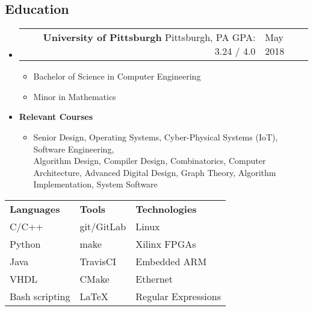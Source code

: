 \documentclass[18pt]{article}
\makeatletter
\providecommand{\tightlist}{
    \setlength{\itemsep}{0pt}\setlength{\parskip}{0pt}
}
\providecommand{\datetable}[2]{
    \begin{tabular*}{\textwidth}{@{}r @{\extracolsep{\fill}} l}
        #1 & #2
    \end{tabular*}
}
\makeatother
\begin{document}
    \subsection*{Education}\label{education}
    \begin{itemize}[label={}]

        \item \datetable{
            \textbf{University of Pittsburgh} \textbar{} Pittsburgh, PA \textbar{} GPA: 3.24 / 4.0
        }{May 2018}
        \begin{itemize}[ topsep=0pt]\tightlist
            \item Bachelor of Science in Computer Engineering
            \item Minor in Mathematics
        \end{itemize}
        \item \textbf{Relevant Courses}
        \begin{itemize}[label={}, topsep=0pt]
            \item
            Senior Design,
            Operating Systems,
            Cyber-Physical Systems (IoT),
            Software Engineering,\\
            Algorithm Design,
            Compiler Design,
            Combinatorics,
            Computer Architecture,
            Advanced Digital Design,
            Graph Theory,
            Algorithm Implementation,
            System Software
        \end{itemize}
    \end{itemize}

    \begin{center}\begin{tabular*}{0.65\textwidth}{ @{\extracolsep{\fill}} lll}
        \textbf{Languages} & \textbf{Tools} & \textbf{Technologies} \\
        C/C++              & git/GitLab     & Linux \\
        Python             & make           & Xilinx FPGAs \\
        Java               & TravisCI       & Embedded ARM \\
        VHDL               & CMake          & Ethernet \\
        Bash scripting     & \LaTeX         & Regular Expressions
    \end{tabular*}\end{center}
\end{document}
